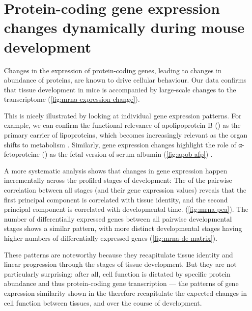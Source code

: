 
\section{Protein-coding gene expression changes dynamically during mouse
development}

Changes in the expression of protein-coding genes, leading to changes in
abundance of proteins, are known to drive cellular behaviour. Our data
confirms that tissue development in mice is accompanied by large-scale changes
to the \mrna transcriptome (\cref{fig:mrna-expression-change}).

This is nicely illustrated by looking at individual gene expression patterns.
For example, we can confirm the functional relevance of apolipoprotein B
() as the primary carrier of lipoproteins, which becomes
increasingly relevant as the organ shifts to metabolism \citep{Knott:1986}.
Similarly, \mrna gene expression changes highlight the role of α-fetoproteine
() as the fetal version of serum albumin (\cref{fig:apob-afp})
\citep{Chen:1997}.

A more systematic analysis shows that changes in gene expression happen
incrementally across the profiled stages of development: The \pca of the
pairwise correlation between all stages (and their gene expression values)
reveals that the first principal component is correlated with tissue identity,
and the second principal component is correlated with developmental time.
(\cref{fig:mrna-pca}). The number of differentially expressed genes between all
pairwise developmental stages shows a similar pattern, with more distinct
developmental stages having higher numbers of differentially expressed genes
(\cref{fig:mrna-de-matrix}).

These patterns are noteworthy because they recapitulate tissue identity and
linear progression through the stages of tissue development. But they are not
particularly surprising: after all, cell function is dictated by specific
protein abundance and thus protein-coding gene transcription --- the patterns of
gene expression similarity shown in the \pca therefore recapitulate the expected
changes in cell function between tissues, and over the course of development.

